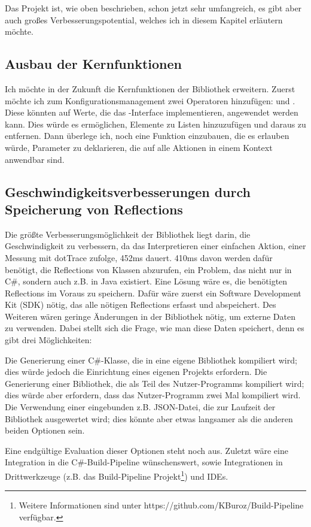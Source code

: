Das Projekt ist, wie oben beschrieben, schon jetzt sehr umfangreich, es gibt aber auch großes Verbesserungspotential, welches ich in diesem Kapitel erläutern möchte.
\subsection{Ausbau der Kernfunktionen}\label{subsec:MoreFunctions}
Ich möchte in der Zukunft die Kernfunktionen der Bibliothek erweitern.
Zuerst möchte ich zum Konfigurationsmanagement zwei Operatoren hinzufügen:  und .
Diese könnten auf Werte, die das -Interface implementieren, angewendet werden kann.
Dies würde es ermöglichen, Elemente zu Listen hinzuzufügen und daraus zu entfernen.
Dann überlege ich, noch eine Funktion einzubauen, die es erlauben würde, Parameter zu deklarieren, die auf alle Aktionen in einem Kontext anwendbar sind.
\subsection{Geschwindigkeitsverbesserungen durch Speicherung von Reflections}\label{subsec:StoringReflections}
Die größte Verbesserungsmöglichkeit der Bibliothek liegt darin, die Geschwindigkeit zu verbessern,
da das Interpretieren einer einfachen Aktion, einer Messung mit dotTrace zufolge, 452ms dauert.
410ms davon werden dafür benötigt, die Reflections von Klassen abzurufen, ein Problem, das nicht nur in C\#, sondern auch z.B. in Java existiert.
Eine Lösung wäre es, die benötigten Reflections im Voraus zu speichern.
Dafür wäre zuerst ein Software Development Kit (SDK) nötig, das alle nötigen Reflections erfasst und abspeichert.
Des Weiteren wären geringe \"Anderungen in der Bibliothek nötig, um externe Daten zu verwenden.
Dabei stellt sich die Frage, wie man diese Daten speichert, denn es gibt drei Möglichkeiten:
\begin{outline}
 \1 Die Generierung einer C\#-Klasse, die in eine eigene Bibliothek kompiliert wird; dies würde jedoch die Einrichtung eines eigenen Projekts erfordern.
 \1 Die Generierung einer Bibliothek, die als Teil des Nutzer-Programms kompiliert wird; dies würde aber erfordern, dass das Nutzer-Programm zwei Mal kompiliert wird.
 \1 Die Verwendung einer eingebunden z.B. JSON-Datei, die zur Laufzeit der Bibliothek ausgewertet wird; dies könnte aber etwas langsamer als die anderen beiden Optionen sein.
\end{outline}
Eine endgültige Evaluation dieser Optionen steht noch aus.
Zuletzt wäre eine Integration in die C\#-Build-Pipeline wünschenswert, sowie Integrationen in Drittwerkzeuge (z.B. das Build-Pipeline
Projekt\footnote{Weitere Informationen sind unter https://github.com/KBuroz/Build-Pipeline verfügbar.}) und IDEs.
